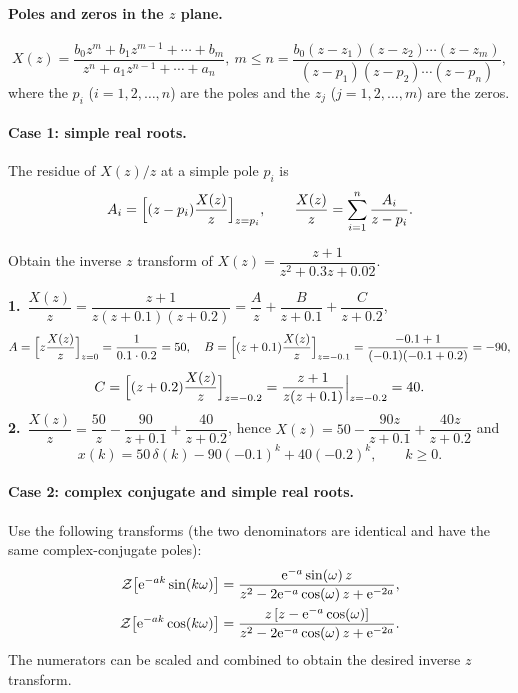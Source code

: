 \paragraph{Poles and zeros in the $z$ plane.}
\[
  X(z)=\frac{b_0z^{m}+b_1z^{m-1}+\cdots+b_m}{z^{n}+a_1z^{n-1}+\cdots+a_n},\ m\le n
  =\frac{b_0(z-z_1)(z-z_2)\cdots(z-z_m)}{(z-p_1)(z-p_2)\cdots(z-p_n)},
\]
where the $p_i$ ($i=1,2,\dots,n$) are the poles and the $z_j$ ($j=1,2,\dots,m$) are the zeros.

\paragraph{Case 1: simple real roots.} The residue of $X(z)/z$ at a simple pole $p_i$ is
\[
  A_i=\Bigl[(z-p_i)\frac{X(z)}{z}\Bigr]_{z=p_i},\qquad
  \frac{X(z)}{z}=\sum_{i=1}^{n}\frac{A_i}{z-p_i}.
\]

\begin{example}
Obtain the inverse $z$ transform of $X(z)=\dfrac{z+1}{z^{2}+0.3z+0.02}$.

\medskip\noindent\textbf{1.}\
$\dfrac{X(z)}{z}=\dfrac{z+1}{z(z+0.1)(z+0.2)}=\dfrac{A}{z}+\dfrac{B}{z+0.1}+\dfrac{C}{z+0.2}$,
\[
  A=\Bigl[z\frac{X(z)}{z}\Bigr]_{z=0}=\frac{1}{0.1\cdot0.2}=50,\quad
  B=\Bigl[(z+0.1)\frac{X(z)}{z}\Bigr]_{z=-0.1}=\frac{-0.1+1}{(-0.1)(-0.1+0.2)}=-90,
\]
\[
  C=\Bigl[(z+0.2)\frac{X(z)}{z}\Bigr]_{z=-0.2}=\frac{z+1}{z(z+0.1)}\Big|_{z=-0.2}=40.
\]
\textbf{2.}\ $\dfrac{X(z)}{z}=\dfrac{50}{z}-\dfrac{90}{z+0.1}+\dfrac{40}{z+0.2}$, hence
$X(z)=50-\dfrac{90z}{z+0.1}+\dfrac{40z}{z+0.2}$ and
\[
  x(k)=50\,\delta(k)-90(-0.1)^{k}+40(-0.2)^{k},\qquad k\ge0.
\]
\end{example}

\paragraph{Case 2: complex conjugate and simple real roots.} Use the following transforms (the two
denominators are identical and have the same complex-conjugate poles):
\begin{align}
  \mathcal{Z}\!\left[\mathrm{e}^{-ak}\sin(k\omega)\right]&=\frac{\mathrm{e}^{-a}\sin(\omega)\,z}{z^{2}-2\mathrm{e}^{-a}\cos(\omega)\,z+\mathrm{e}^{-2a}},\\
  \mathcal{Z}\!\left[\mathrm{e}^{-ak}\cos(k\omega)\right]&=\frac{z\,[z-\mathrm{e}^{-a}\cos(\omega)]}{z^{2}-2\mathrm{e}^{-a}\cos(\omega)\,z+\mathrm{e}^{-2a}}.
\end{align}
The numerators can be scaled and combined to obtain the desired inverse $z$ transform.

